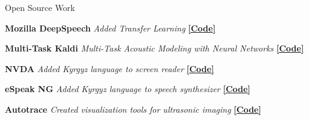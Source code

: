 \documentclass{resume} %
\begin{document}

\vspace{.25cm}

\begin{rSection}{Open Source Work}

{\textbf{Mozilla DeepSpeech}} {\hfill \textit{Added Transfer Learning} {\hspace{2.5cm} \href{https://github.com/mozilla/DeepSpeech/releases/tag/v0.7.0}{\textbf{[Code]}}}} \\\vspace{-.35cm}

{\textbf{Multi-Task Kaldi}} {\hfill \textit{Multi-Task Acoustic Modeling with Neural Networks} {\hspace{2.5cm} \href{https://github.com/JRMeyer/multi-task-kaldi}{\textbf{[Code]}}}} \\\vspace{-.35cm}

{\textbf{NVDA}} {\hfill \textit{Added Kyrgyz language to screen reader} {\hspace{2.5cm} \href{https://github.com/JRMeyer/nvda}{\textbf{[Code]}}}} \\\vspace{-.35cm}

{\textbf{eSpeak NG}} {\hfill \textit{Added Kyrgyz language to speech synthesizer} {\hspace{2.5cm} \href{https://github.com/rhdunn/espeak/commits?author=JRMeyer}{\textbf{[Code]}}}}\\\vspace{-.35cm}

{\textbf{Autotrace}} {\hfill \textit{Created visualization tools for ultrasonic imaging} {\hspace{2.5cm} \href{https://github.com/JRMeyer/Autotrace}{\textbf{[Code]}}}} \\
\end{rSection}



\vspace{.25cm}
\end{document}
